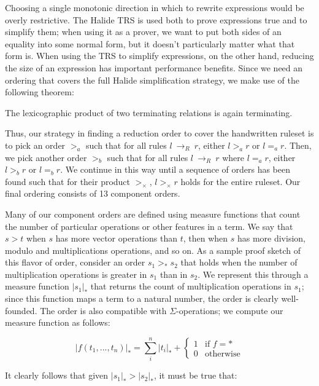 \documentclass[acmsmall]{acmart}\settopmatter{}
\newcommand{\rewrites}[0]{\:\rightarrow_{R}\:}
\begin{document}
Choosing a single monotonic direction in which to rewrite expressions would be overly restrictive. 
The Halide TRS is used both to prove expressions true and to simplify them; when using it as a prover, we want to put both sides of an equality into some normal form, but it doesn't particularly matter what that form is. When using the TRS to simplify expressions, on the other hand, reducing the size of an expression has important performance benefits. Since we need an ordering that covers the full Halide simplification strategy, we make use of the following theorem:

\begin{theorem}
The lexicographic product of two terminating relations is again terminating.
\end{theorem}

Thus, our strategy in finding a reduction order to cover the handwritten ruleset is to pick an order $>_a$ such that for all rules $l \rewrites r$, either $l >_a r$ or $l =_a r$. Then, we pick another order $>_b$ such that for all rules $l \rewrites r$ where $l =_a r$, either $l >_b r$ or $l =_b r$. We continue in this way until a sequence of orders has been found such that for their product $>_{\times}$, $l >_{\times} r$ holds for the entire ruleset.  Our final ordering consists of 13 component orders.

Many of our component orders are defined using measure functions that count the number of particular operations or other features in a term. We say that $s > t$ when $s$ has more vector operations than $t$, then when $s$ has more division, modulo and multiplications operations, and so on. As a sample proof sketch of this flavor of order, consider an order $s_1 >_* s_2$ that holds when the number of multiplication operations is greater in $s_1$ than in $s_2$. We represent this through a measure function $|s_1|_*$ that returns the count of multiplication operations in $s_1$; since this function maps a term to a natural number, the order is clearly well-founded. The order is also compatible with $\Sigma$-operations; we compute our measure function as follows:


\[
|f(t_1,...,t_n)|_* = \sum_i^n |t_i|_* + \begin{cases} 1 & \textrm{if } f = * \\
                                                      0 & \textrm{otherwise}
                                        \end{cases}
\]

It clearly follows that given $|s_1|_* > |s_2|_*$, it must be true that:
\end{document}
